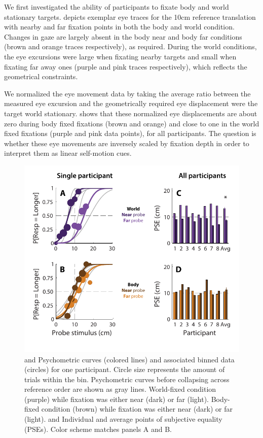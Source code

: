 We first investigated the ability of participants to fixate body and world stationary targets.  depicts exemplar eye traces for the 10cm reference translation with nearby and far fixation points in both the body and world condition. Changes in gaze are largely absent in the body near and body far conditions (brown and orange traces respectively), as required. During the world conditions, the eye excursions were large when fixating nearby targets and small when fixating far away ones (purple and pink traces respectively), which reflects the geometrical constraints.

We normalized the eye movement data by taking the average ratio between the measured eye excursion and the geometrically required eye displacement were the target world stationary.  shows that these normalized eye displacements are about zero during body fixed fixations (brown and orange) and close to one in the world fixed fixations (purple and pink data points), for all participants. The question is whether these eye movements are inversely scaled by fixation depth in order to interpret them as linear self-motion cues.

\begin{figure}
    \includegraphics[width=1.0\textwidth]{src/paper4/p4_figure3.pdf}

	\caption{ and  Psychometric curves (colored lines) and associated binned data (circles) for one participant. Circle size represents the amount of trials within the bin. Psychometric curves before collapsing across reference order are shown as gray lines.  World-fixed condition (purple) while fixation was either near (dark) or far (light).  Body-fixed condition (brown) while fixation was either near (dark) or far (light).
	 and  Individual and average points of subjective equality (PSEs). Color scheme matches panels A and B.
	}
	\label{p4:fig3}
\end{figure}

